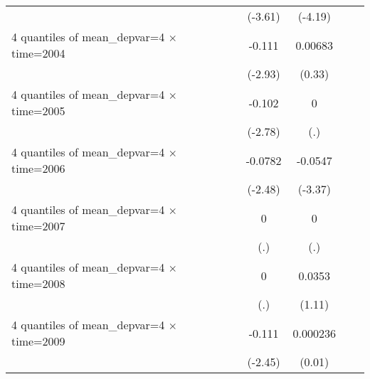 \begin{table}[htbp]
\begin{tabular}{l*{6}{c}}
                    &                     &                     &     (-3.61)         &     (-4.19)         &                     &                     \\
[1em]
4 quantiles of mean\_depvar=4 $\times$ time=2004&                     &                     &      -0.111\sym{***}&     0.00683         &                     &                     \\
                    &                     &                     &     (-2.93)         &      (0.33)         &                     &                     \\
[1em]
4 quantiles of mean\_depvar=4 $\times$ time=2005&                     &                     &      -0.102\sym{**} &           0         &                     &                     \\
                    &                     &                     &     (-2.78)         &         (.)         &                     &                     \\
[1em]
4 quantiles of mean\_depvar=4 $\times$ time=2006&                     &                     &     -0.0782\sym{**} &     -0.0547\sym{***}&                     &                     \\
                    &                     &                     &     (-2.48)         &     (-3.37)         &                     &                     \\
[1em]
4 quantiles of mean\_depvar=4 $\times$ time=2007&                     &                     &           0         &           0         &                     &                     \\
                    &                     &                     &         (.)         &         (.)         &                     &                     \\
[1em]
4 quantiles of mean\_depvar=4 $\times$ time=2008&                     &                     &           0         &      0.0353         &                     &                     \\
                    &                     &                     &         (.)         &      (1.11)         &                     &                     \\
[1em]
4 quantiles of mean\_depvar=4 $\times$ time=2009&                     &                     &      -0.111\sym{**} &    0.000236         &                     &                     \\
                    &                     &                     &     (-2.45)         &      (0.01)         &                     &                     \\

\end{tabular}
\end{table}
